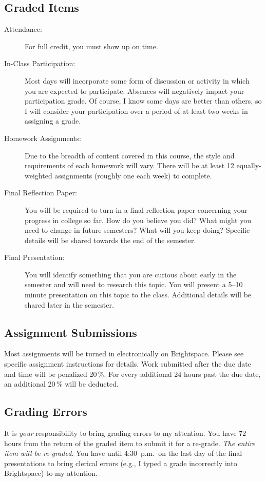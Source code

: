\documentclass[11pt,letterpaper]{article}
\begin{document}
\subsection{Graded Items}
\begin{description}
	\item[Attendance:] For full credit, you must show up on time.
	\item[In-Class Participation:]
		Most days will incorporate some form of discussion or activity
		in which you are expected to participate. Absences will
		negatively impact your participation grade. Of course, I know
		some days are better than others, so I will consider your
		participation over a period of at least two weeks in assigning a
		grade.
	\item[Homework Assignments:] Due to the breadth of content covered in
		this course, the style and requirements of each homework will
		vary. There will be at least 12 equally-weighted assignments
		(roughly one each week) to complete.
	\item[Final Reflection Paper:] You will be required to turn in a final
		reflection paper concerning your progress in college so far. How
		do you believe you did? What might you need to change in future
		semesters? What will you keep doing? Specific details will be
		shared towards the end of the semester.
	\item[Final Presentation:] You will identify something that you are
		curious about early in the semester and will need to research
		this topic. You will present a 5--10 minute presentation on this
		topic to the class. Additional details will be shared later in
		the semester.
\end{description}

\subsection{Assignment Submissions}
Most assignments will be turned in electronically on Brightspace. Please see
specific assignment instructions for details. Work submitted after the due date
and time will be penalized 20\,\%. For every additional 24 hours past the due
date, an additional 20\,\% will be deducted.

\subsection{Grading Errors}
It is \emph{your} responsibility to bring grading errors to my attention. You
have 72 hours from the return of the graded item to submit it for a re-grade.
\emph{The entire item will be re-graded}. You have until 4:30~p.m.\ on the last
day of the final presentations to bring clerical errors (e.g., I typed a grade
incorrectly into Brightspace) to my attention.
\end{document}
